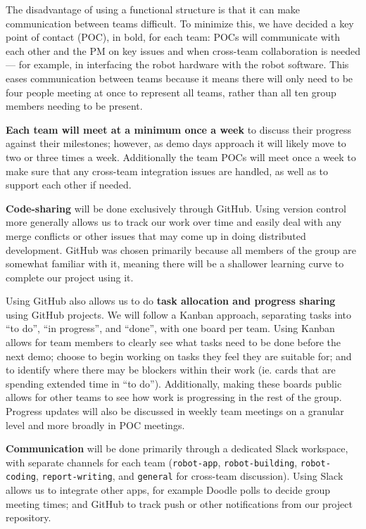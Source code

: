 \documentclass{article}
\begin{document}
The disadvantage of using a functional structure is that it can make communication between teams difficult. To minimize this, we have decided a key point of contact (POC), in bold, for each team: POCs will communicate with each other and the PM on key issues and when cross-team collaboration is needed --- for example, in interfacing the robot hardware with the robot software. This eases communication between teams because it means there will only need to be four people meeting at once to represent all teams, rather than all ten group members needing to be present.

{\bf Each team will meet at a minimum once a week} to discuss their progress against their milestones; however, as demo days approach it will likely move to two or three times a week. Additionally the team POCs will meet once a week to make sure that any cross-team integration issues are handled, as well as to support each other if needed. 

{\bf Code-sharing} will be done exclusively through GitHub. Using version control more generally allows us to track our work over time and easily deal with any merge conflicts or other issues that may come up in doing distributed development. GitHub was chosen primarily because all members of the group are somewhat familiar with it, meaning there will be a shallower learning curve to complete our project using it. 

Using GitHub also allows us to do {\bf task allocation and progress sharing} using GitHub projects. We will follow a Kanban approach, separating tasks into ``to do'', ``in progress'', and ``done'', with one board per team. Using Kanban allows for team members to clearly see what tasks need to be done before the next demo; choose to begin working on tasks they feel they are suitable for; and to identify where there may be blockers within their work (ie. cards that are spending extended time in ``to do''). Additionally, making these boards public allows for other teams to see how work is progressing in the rest of the group. Progress updates will also be discussed in weekly team meetings on a granular level and more broadly in POC meetings.

{\bf Communication} will be done primarily through a dedicated Slack workspace, with separate channels for each team ({\tt robot-app}, {\tt robot-building}, {\tt robot-coding}, {\tt report-writing}, and {\tt general} for cross-team discussion). Using Slack allows us to integrate other apps, for example Doodle polls to decide group meeting times; and GitHub to track push or other notifications from our project repository. 




\end{document}
